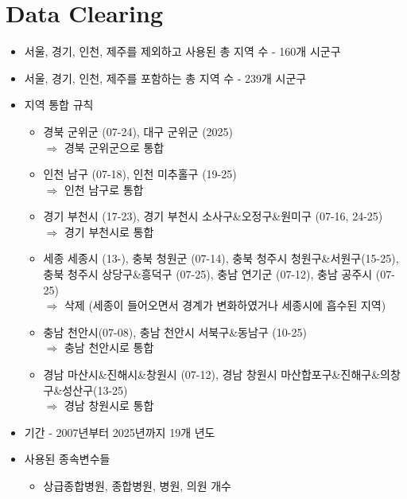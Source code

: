 \documentclass[a4paper, 10pt]{article}
\begin{document}
    \onehalfspacing

    \section{Data Clearing}
        \begin{itemize}
            \item 서울, 경기, 인천, 제주를 제외하고 사용된 총 지역 수 - 160개 시군구
            \item 서울, 경기, 인천, 제주를 포함하는 총 지역 수 - 239개 시군구
            \item 지역 통합 규칙
                \begin{itemize}
                    \item 경북 군위군 (07-24), 대구 군위군 (2025) \\
                        $\Rightarrow$ 경북 군위군으로 통합
                    \item 인천 남구 (07-18), 인천 미추홀구 (19-25) \\
                        $\Rightarrow$ 인천 남구로 통합
                    \item 경기 부천시 (17-23), 경기 부천시 소사구\&오정구\&원미구 (07-16, 24-25) \\
                        $\Rightarrow$ 경기 부천시로 통합
                    \item 세종 세종시 (13-), 충북 청원군 (07-14), 충북 청주시 청원구\&서원구(15-25),
                        충북 청주시 상당구\&흥덕구 (07-25), 충남 연기군 (07-12), 충남 공주시 (07-25) \\
                        $\Rightarrow$ 삭제 (세종이 들어오면서 경계가 변화하였거나 세종시에 흡수된 지역)
                    \item 충남 천안시(07-08), 충남 천안시 서북구\&동남구 (10-25) \\
                        $\Rightarrow$ 충남 천안시로 통합
                    \item 경남 마산시\&진해시\&창원시 (07-12),
                        경남 창원시 마산합포구\&진해구\&의창구\&성산구(13-25) \\
                        $\Rightarrow$ 경남 창원시로 통합
                \end{itemize}
            \item 기간 - 2007년부터 2025년까지 19개 년도
            \item 사용된 종속변수들
                \begin{itemize}
                    \item 상급종합병원, 종합병원, 병원, 의원 개수

\end{itemize}
\end{itemize}
\end{document}

